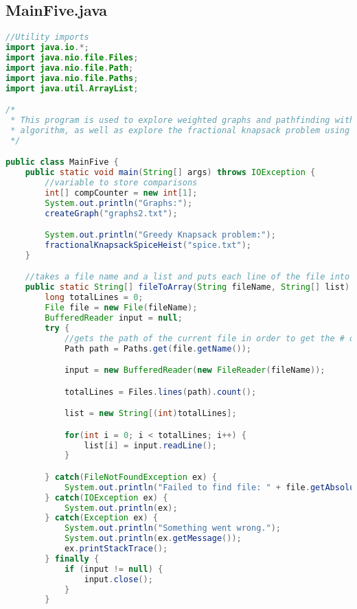 \documentclass[letterpaper, 10pt,DIV=13]{scrartcl}
\numberwithin{equation}{section} %
\numberwithin{figure}{section} %
\numberwithin{table}{section} %
\begin{document}
\subsection{MainFive.java}
\begin{lstlisting}[frame=single, language=java, breaklines]  
//Utility imports
import java.io.*;
import java.nio.file.Files;
import java.nio.file.Path;
import java.nio.file.Paths;
import java.util.ArrayList;

/* 
 * This program is used to explore weighted graphs and pathfinding within them using the Bellman-Ford Single-Source Shortest Path
 * algorithm, as well as explore the fractional knapsack problem using a greedy algorithm.
 */

public class MainFive {
    public static void main(String[] args) throws IOException {
        //variable to store comparisons 
        int[] compCounter = new int[1];
        System.out.println("Graphs:");
        createGraph("graphs2.txt");

        System.out.println("Greedy Knapsack problem:");
        fractionalKnapsackSpiceHeist("spice.txt");
    }

    //takes a file name and a list and puts each line of the file into a String in an array
    public static String[] fileToArray(String fileName, String[] list) throws IOException {
        long totalLines = 0;
        File file = new File(fileName);
        BufferedReader input = null;
        try {
            //gets the path of the current file in order to get the # of lines
            Path path = Paths.get(file.getName());

            input = new BufferedReader(new FileReader(fileName)); 

            totalLines = Files.lines(path).count();

            list = new String[(int)totalLines];

            for(int i = 0; i < totalLines; i++) {
                list[i] = input.readLine();
            }

        } catch(FileNotFoundException ex) {
            System.out.println("Failed to find file: " + file.getAbsolutePath());
        } catch(IOException ex) {
            System.out.println(ex);
        } catch(Exception ex) {
            System.out.println("Something went wrong.");
            System.out.println(ex.getMessage());
            ex.printStackTrace();
        } finally {
            if (input != null) {
                input.close();
            }
        }


\end{lstlisting}
\end{document}
